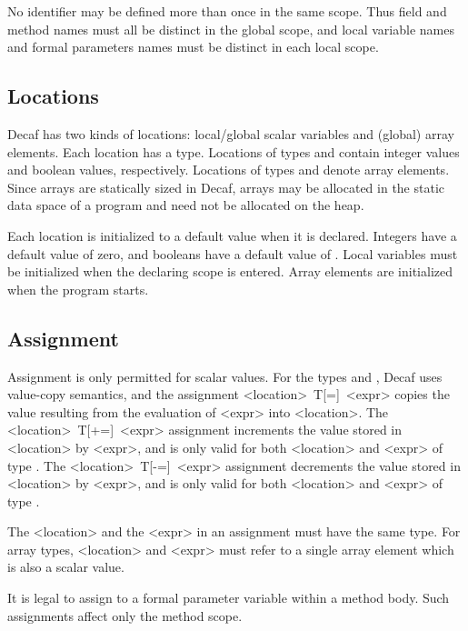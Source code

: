 No identifier may be defined more than once in the same scope.  Thus
field and method names must all be distinct in the global scope, and
local variable names and formal parameters names must be distinct in
each local scope.

\subsection*{Locations}

Decaf has two kinds of locations: local/global scalar
variables and (global) array elements.  Each location has a type.
Locations of types  and  contain integer values and
boolean values, respectively.  Locations of types 
and  denote array elements.  Since arrays are
statically sized in Decaf, arrays may be allocated in the
static data space of a program and need not be allocated on the heap.

Each location is initialized to a default value when it is declared.
Integers have a default value of zero, and booleans have a default
value of .  Local variables must be initialized when the
declaring scope is entered.  Array elements are initialized when the
program starts.

\subsection*{Assignment}

Assignment is only permitted for scalar values.  For the types
 and , Decaf uses value-copy semantics, and the
assignment {\bnf <location>~T[=]~<expr>} copies the value resulting
from the evaluation of {\bnf <expr>} into {\bnf <location>}.  The
{\bnf <location>~T[+=]~<expr>} assignment increments the value
stored in {\bnf <location>} by {\bnf <expr>}, and is only valid for
both {\bnf <location>} and {\bnf <expr>} of type . The
{\bnf <location>~T[-=]~<expr>} assignment decrements the value
stored in {\bnf <location>} by {\bnf <expr>}, and is only valid for
both {\bnf <location>} and {\bnf <expr>} of type .

The {\bnf <location>} and the {\bnf <expr>} in an assignment must
have the same type. For array types, {\bnf <location>} and {\bnf
<expr>} must refer to a single array element which is also a scalar
value.

It is legal to assign to a formal parameter variable within a method
body.  Such assignments affect only the method scope.

